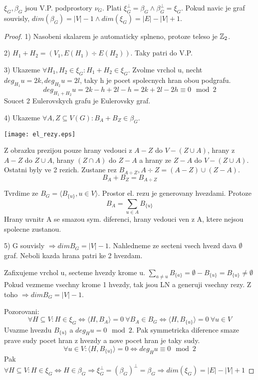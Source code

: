 \begin{theorem}
	$\xi_G, \beta_G$ jsou V.P. podprostory $\nu_G$. Plati $\xi_G^{\perp} = \beta_G \land \beta_G^{\perp} = \xi_G$. Pokud navic je graf souvisly, $dim(\beta_G) = |V| - 1 \land dim(\xi_G) = |E| - |V| + 1$.
\end{theorem}
\begin{proof}
	1) Nasobeni skalarem je automaticky splneno, protoze teleso je $\operatorname{\mathbb{Z}}_2$.

	2) $H_1 + H_2 = (V_1, E(H_1) \div E(H_2))$. Taky patri do V.P.

	3) Ukazeme $\forall H_1, H_2 \in \xi_G: H_1 + H_2 \in \xi_G$. Zvolme vrchol u, necht $deg_{H_1} u = 2k, deg_{H_2} u = 2l$, taky h je pocet spolecnych hran obou podgrafu.
	\[ deg_{H_1 + H_2} u = 2k - h + 2l - h = 2k + 2l - 2h \equiv 0 \mod2 \]
	Soucet 2 Eulerovskych grafu je Eulerovsky graf.

	4) Ukazeme $\forall A,Z \subseteq V(G): B_A + B_Z \in \beta_G$.

	\texttt{[image: el\_rezy.eps]}

	Z obrazku prezijou pouze hrany vedouci z $A - Z$ do $V - (Z\cup A)$, hrany z $A - Z$ do $Z \cup A$, hrany $(Z \cap A)$ do $Z - A$ a hrany ze $Z - A$ do $V - (Z\cup A)$. Ostatni byly ve 2 rezich. Zustane rez $B_{A \div Z}, A \div Z = (A - Z) \cup (Z - A)$.
	\[ B_A + B_Z = B_{A \div Z}\]

	Tvrdime ze $B_G = \langle B_{\{u\}}, u \in V \rangle$. Prostor el. rezu je generovany hvezdami. Protoze
	\[ B_A = \sum_{u \in A} B_{\{u\}} \]
	Hrany uvnitr A se smazou sym. diferenci, hrany vedouci ven z A, ktere nejsou spolecne zustanou.

	5) G souvisly $\Rightarrow dim B_G = |V| - 1$. Nahledneme ze secteni vsech hvezd dava $\emptyset$ graf. Neboli kazda hrana patri ke 2 hvezdam.

	Zafixujeme vrchol u, secteme hvezdy krome u. $ \sum_{a \ne u} B_{\{a\}} = \emptyset - B_{\{u\}} = B_{\{u\}} \ne \emptyset $
	Pokud vezmeme vsechny krome 1 hvezdy, tak jsou LN a generuji vsechny rezy. Z toho $\Rightarrow dim B_G = |V| - 1$.

	Pozorovani:
	\[ \forall H \subseteq V: H \in \xi_G \iff \langle H, B_A \rangle = 0 \ \forall B_A \in B_G \iff \langle H, B_{\{u\}} \rangle = 0 \ \forall u \in V \]
	Uvazme hvezdu $B_{\{u\}}$ a $deg_H u = 0 \mod2$. Pak symmetricka diference smaze prave sudy pocet hran z hvezdy a nove pocet hran je taky sudy.
	\[ \forall u \in V: \langle H, B_{\{u\}} \rangle = 0 \iff deg_H u \equiv 0 \mod2 \]
		Pak $ \forall H \subseteq V: H \in \xi_G \iff H \in \beta_G \Rightarrow \xi_G^{\perp} = (\beta_G^{})^{\perp} = \beta_G \Rightarrow dim(\xi_G) = |E| - |V| + 1 $

\end{proof}
